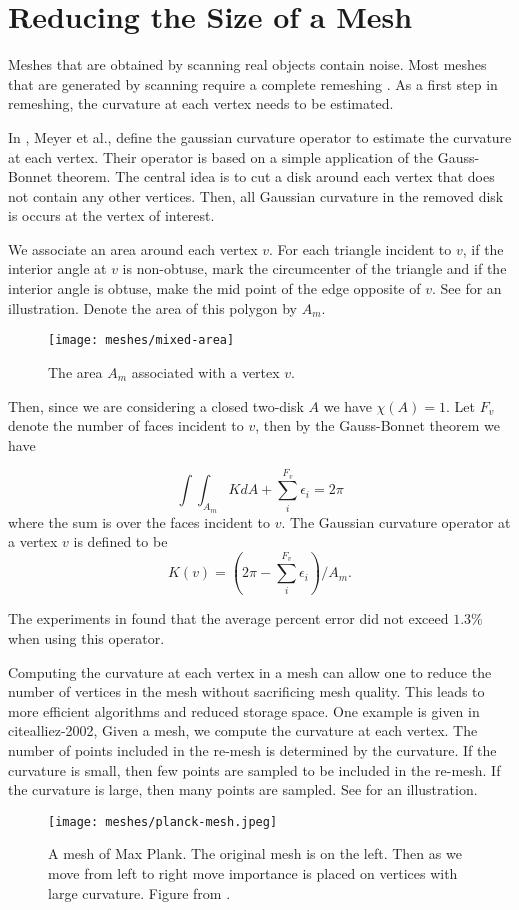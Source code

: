 \section{Reducing the Size of a Mesh}
\label{sec:removing}



Meshes that are obtained by scanning real objects contain noise.
Most meshes that are generated by scanning require a complete
remeshing \cite{remeshing-2003}.
As a first step in remeshing, the curvature at each
vertex needs to be estimated.

In \cite{mmsb-2003}, Meyer et al., define the gaussian curvature operator
to estimate the curvature at each vertex. Their operator is 
based on a simple application of the Gauss-Bonnet theorem.
The central idea is to cut a disk around each vertex that does not contain
any other vertices. Then, all Gaussian curvature in the removed
disk is occurs at the vertex of interest.

We associate an area around each vertex $v$. 
For each triangle incident to $v$, if the interior 
angle at $v$ is non-obtuse, mark the circumcenter of the triangle
and if the interior angle is obtuse, make the mid point of the edge
opposite of $v$. See  for an illustration.
Denote the area of this polygon by $A_m.$


\begin{figure}[htb]
\centering
\texttt{[image: meshes/mixed-area]}
\caption{The area $A_m$ associated with a vertex $v$.}
\label{fig:mixed-area}
\end{figure}


Then, since we are considering a closed two-disk $A$ we have $\chi(A)=1$.
Let $F_v$ denote the number of faces incident to $v$, 
then by the Gauss-Bonnet theorem we have

$$\int \int_{A_m}K dA +\sum_i^{F_v} \epsilon_i=2\pi$$
where the sum is over the faces incident to $v$.
The Gaussian curvature operator at a vertex $v$ is defined
to be
$$K(v)=\left( 2\pi -\sum_i^{F_v}\epsilon_i\right)/ A_m.$$

The experiments in \cite{mmsb-2003} found that the average
percent error did not exceed $1.3\%$ when using this operator.

Computing the curvature at each vertex in a mesh can allow one to reduce
the number of vertices in the mesh without sacrificing mesh quality.
This leads to more efficient algorithms and reduced storage space.
One example is given in cite{alliez-2002},
Given a mesh, we compute the curvature at each vertex.
The number of points included in the re-mesh is determined
by the curvature. If the curvature is small, then few points
are sampled to be included in the re-mesh. If the curvature
is large, then many points are sampled. See 
for an illustration.

\begin{figure}[htb]
\centering
\texttt{[image: meshes/planck-mesh.jpeg]}
\caption{A mesh of Max Plank. The original mesh is on the left. Then as we move
from left to right move importance is placed on vertices with large curvature.
Figure from \cite{alliez-2002}.}
\label{fig:planck-mesh}
\end{figure}